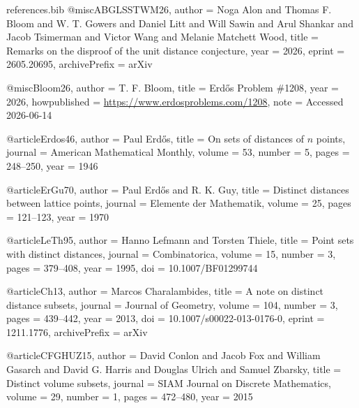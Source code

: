
\begin{filecontents*}{references.bib}
@misc{ABGLSSTWM26,
  author       = {Noga Alon and Thomas F. Bloom and W. T. Gowers and Daniel Litt and Will Sawin and Arul Shankar and Jacob Tsimerman and Victor Wang and Melanie Matchett Wood},
  title        = {Remarks on the disproof of the unit distance conjecture},
  year         = {2026},
  eprint       = {2605.20695},
  archivePrefix = {arXiv}
}

@misc{Bloom26,
  author       = {T. F. Bloom},
  title        = {{Erd{\H{o}}s Problem {\#}1208}},
  year         = {2026},
  howpublished = {\url{https://www.erdosproblems.com/1208}},
  note         = {Accessed 2026-06-14}
}

@article{Erdos46,
  author  = {Paul Erd\H{o}s},
  title   = {On sets of distances of {$n$} points},
  journal = {American Mathematical Monthly},
  volume  = {53},
  number  = {5},
  pages   = {248--250},
  year    = {1946}
}

@article{ErGu70,
  author  = {Paul Erd\H{o}s and R. K. Guy},
  title   = {Distinct distances between lattice points},
  journal = {Elemente der Mathematik},
  volume  = {25},
  pages   = {121--123},
  year    = {1970}
}

@article{LeTh95,
  author  = {Hanno Lefmann and Torsten Thiele},
  title   = {Point sets with distinct distances},
  journal = {Combinatorica},
  volume  = {15},
  number  = {3},
  pages   = {379--408},
  year    = {1995},
  doi     = {10.1007/BF01299744}
}

@article{Ch13,
  author  = {Marcos Charalambides},
  title   = {A note on distinct distance subsets},
  journal = {Journal of Geometry},
  volume  = {104},
  number  = {3},
  pages   = {439--442},
  year    = {2013},
  doi     = {10.1007/s00022-013-0176-0},
  eprint  = {1211.1776},
  archivePrefix = {arXiv}
}

@article{CFGHUZ15,
  author  = {David Conlon and Jacob Fox and William Gasarch and David G. Harris and Douglas Ulrich and Samuel Zbarsky},
  title   = {Distinct volume subsets},
  journal = {SIAM Journal on Discrete Mathematics},
  volume  = {29},
  number  = {1},
  pages   = {472--480},
  year    = {2015}
}


\end{filecontents*}
